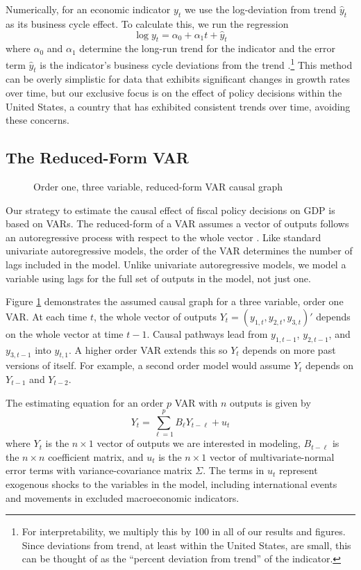 Numerically, for an economic indicator $y_t$ we use the log-deviation from trend $\hat{y}_t$ as its business cycle effect. To calculate this, we run the regression
\[
    \log y_t = \alpha_0 + \alpha_1 t + \hat{y}_t
\]
where $\alpha_0$ and $\alpha_1$ determine the long-run trend for the indicator and the error term $\hat{y}_t$ is the indicator's business cycle deviations from the trend \parencite{seip2024scoring}.\footnote{For interpretability, we multiply this by 100 in all of our results and figures. Since deviations from trend, at least within the United States, are small, this can be thought of as the ``percent deviation from trend'' of the indicator.} This method can be overly simplistic for data that exhibits significant changes in growth rates over time, but our exclusive focus is on the effect of policy decisions within the United States, a country that has exhibited consistent trends over time, avoiding these concerns.


\subsection{The Reduced-Form VAR}

\begin{figure}[t!]
    \centering
    \caption{Order one, three variable, reduced-form VAR causal graph}
    
    \label{fig:rfvar-graph}
\end{figure}

Our strategy to estimate the causal effect of fiscal policy decisions on GDP is based on VARs. The reduced-form of a VAR assumes a vector of outputs follows an autoregressive process with respect to the whole vector \parencite{neusser2016time}. Like standard univariate autoregressive models, the order of the VAR determines the number of lags included in the model. Unlike univariate autoregressive models, we model a variable using lags for the full set of outputs in the model, not just one.

Figure \ref{fig:rfvar-graph} demonstrates the assumed causal graph for a three variable, order one VAR. At each time $t$, the whole vector of outputs $Y_t = (y_{1, t}, y_{2, t}, y_{3, t})'$ depends on the whole vector at time $t-1$. Causal pathways lead from $y_{1, t-1}$, $y_{2, t-1}$, and $y_{3, t-1}$ into $y_{t,1}$. A higher order VAR extends this so $Y_t$ depends on more past versions of itself. For example, a second order model would assume $Y_t$ depends on $Y_{t-1}$ and $Y_{t-2}$.

The estimating equation for an order $p$ VAR with $n$ outputs is given by
\[
    Y_t = \sum_{\ell = 1}^p B_\ell Y_{t - \ell} + u_t
\]
where $Y_t$ is the $n \times 1$ vector of outputs we are interested in modeling, $B_{t - \ell}$ is the $n \times n$ coefficient matrix, and $u_t$ is the $n \times 1$ vector of multivariate-normal error terms with variance-covariance matrix $\Sigma$. The terms in $u_t$ represent exogenous shocks to the variables in the model, including international events and movements in excluded macroeconomic indicators.


